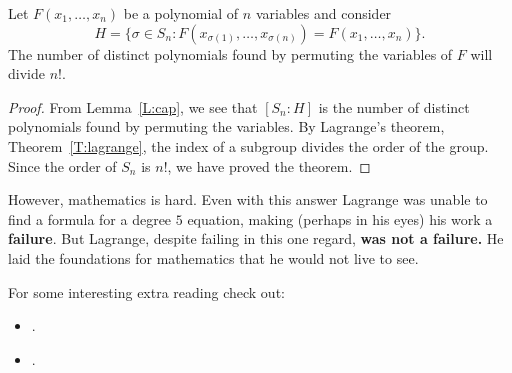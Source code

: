 \documentclass{ximera}
\begin{document}
\begin{theorem}
  Let $F(x_1,\dots,x_n)$ be a polynomial of $n$ variables and consider
  \[
  H = \{\sigma\in S_n: F(x_{\sigma(1)},\dots, x_{\sigma(n)}) = F(x_1,\dots,x_n)\}.
  \]
  The number of distinct polynomials found by permuting the
  variables of $F$ will divide $n!$.
    \begin{proof}
      From Lemma~\ref{L:cap}, we see that $[S_n:H]$ is the number of
      distinct polynomials found by permuting the variables. By
      Lagrange's theorem, Theorem~\ref{T:lagrange}, the index of a
      subgroup divides the order of the group. Since the order of
      $S_n$ is $n!$, we have proved the theorem.
      \end{proof}
\end{theorem}


However, mathematics is hard. Even with this answer Lagrange was
unable to find a formula for a degree $5$ equation, making (perhaps in
his eyes) his work a \textbf{failure}. But Lagrange, despite failing
in this one regard, \textbf{was not a failure.} He laid the
foundations for mathematics that he would not live to see.




For some interesting extra reading check out:
\begin{itemize}
\item {}.
\item {}.
\end{itemize}
\end{document}
